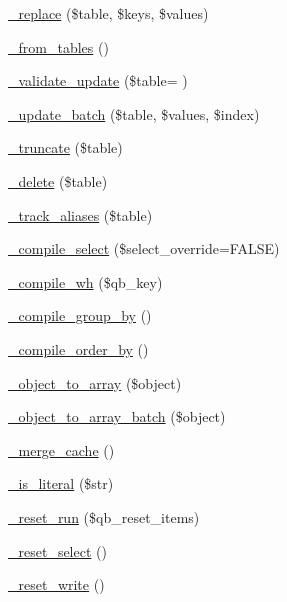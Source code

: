 \begin{DoxyCompactItemize}
\item 
\hyperlink{class_c_i___d_b__query__builder_ae0adf73984daf2d42ad29b66c484c82b}{\+\_\+replace} (\$table, \$keys, \$values)
\item 
\hyperlink{class_c_i___d_b__query__builder_aef43f7e3e7b71d337ff3724c5eb14f10}{\+\_\+from\+\_\+tables} ()
\item 
\hyperlink{class_c_i___d_b__query__builder_a51e02a6f3e72f26131f6e2189ee2f81c}{\+\_\+validate\+\_\+update} (\$table= \textquotesingle{}\textquotesingle{})
\item 
\hyperlink{class_c_i___d_b__query__builder_a336b9ebb119e47b6a84bb7fc9d4dae93}{\+\_\+update\+\_\+batch} (\$table, \$values, \$index)
\item 
\hyperlink{class_c_i___d_b__query__builder_aa029600528fc1ce660a23ff4b4667f95}{\+\_\+truncate} (\$table)
\item 
\hyperlink{class_c_i___d_b__query__builder_a133ea8446ded52589bd22cc9163d0896}{\+\_\+delete} (\$table)
\item 
\hyperlink{class_c_i___d_b__query__builder_afb539c1557a7cb20a190f5b68d96b74a}{\+\_\+track\+\_\+aliases} (\$table)
\item 
\hyperlink{class_c_i___d_b__query__builder_a441f6e994a212cfa12dd33d92973915b}{\+\_\+compile\+\_\+select} (\$select\+\_\+override=F\+A\+L\+S\+E)
\item 
\hyperlink{class_c_i___d_b__query__builder_a3d2301b84734fd18a0db6d0602106f48}{\+\_\+compile\+\_\+wh} (\$qb\+\_\+key)
\item 
\hyperlink{class_c_i___d_b__query__builder_a953e760f382d7187dc5d7b238a7ff439}{\+\_\+compile\+\_\+group\+\_\+by} ()
\item 
\hyperlink{class_c_i___d_b__query__builder_a78ef026e2ca49e2b371f9cc577f6e777}{\+\_\+compile\+\_\+order\+\_\+by} ()
\item 
\hyperlink{class_c_i___d_b__query__builder_a50b3069661bbf4605b6b561f38eae849}{\+\_\+object\+\_\+to\+\_\+array} (\$object)
\item 
\hyperlink{class_c_i___d_b__query__builder_ab53f659c5df0b0b6d30eaab74f507dc5}{\+\_\+object\+\_\+to\+\_\+array\+\_\+batch} (\$object)
\item 
\hyperlink{class_c_i___d_b__query__builder_aeee4c0cf664e1a65d7eb8a3c8e9970c6}{\+\_\+merge\+\_\+cache} ()
\item 
\hyperlink{class_c_i___d_b__query__builder_a645d9af97f1d078041e8ae451fae9e1b}{\+\_\+is\+\_\+literal} (\$str)
\item 
\hyperlink{class_c_i___d_b__query__builder_aebc5876417533f3347aeae458ccde988}{\+\_\+reset\+\_\+run} (\$qb\+\_\+reset\+\_\+items)
\item 
\hyperlink{class_c_i___d_b__query__builder_a7c6cc16411b9c36fbfd42a9317f64317}{\+\_\+reset\+\_\+select} ()
\item 
\hyperlink{class_c_i___d_b__query__builder_ae49808f6becc0366eef957756c8309e4}{\+\_\+reset\+\_\+write} ()
\end{DoxyCompactItemize}
